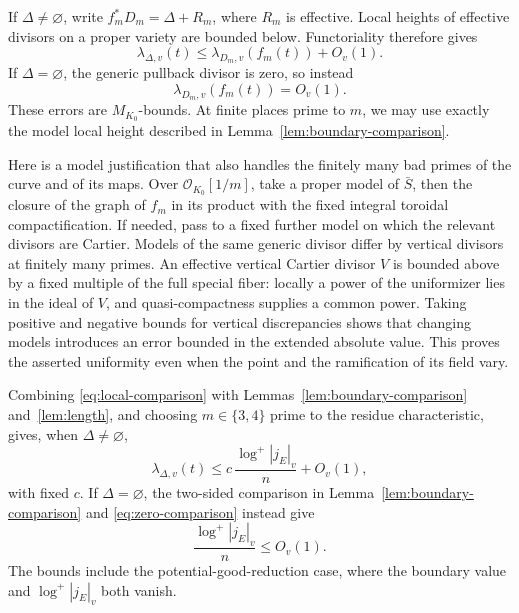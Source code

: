 \documentclass[11pt,a4paper]{article}
\numberwithin{equation}{section}
\theoremstyle{definition}
\theoremstyle{remark}
\begin{document}
If \(\Delta\ne\varnothing\), write
\(f_m^*D_m=\Delta+R_m\), where \(R_m\) is effective. Local heights of
effective divisors on a proper variety are bounded below.
Functoriality therefore gives
\begin{equation}\label{eq:local-comparison}
 \lambda_{\Delta,v}(t)
 \le\lambda_{D_m,v}(f_m(t))+O_v(1).
\end{equation}
If \(\Delta=\varnothing\), the generic pullback divisor is zero, so
instead
\begin{equation}\label{eq:zero-comparison}
 \lambda_{D_m,v}(f_m(t))=O_v(1).
\end{equation}
These errors are \(M_{K_0}\)-bounds. At finite places prime to \(m\),
we may use exactly the model local height described in
Lemma~\ref{lem:boundary-comparison}.

Here is a model justification that also handles the finitely many
bad primes of the curve and of its maps. Over
\(\mathcal O_{K_0}[1/m]\), take a proper model of \(\bar S\),
then the closure of the graph of \(f_m\) in its product with the
fixed integral toroidal compactification. If needed, pass to a
fixed further model on which the relevant divisors are Cartier. Models of the same generic divisor differ by
vertical divisors at finitely many primes. An effective vertical
Cartier divisor \(V\) is bounded above by a fixed multiple of the
full special fiber: locally a power of the uniformizer lies in the
ideal of \(V\), and quasi-compactness supplies a common power.
Taking positive and negative bounds for vertical discrepancies
shows that changing models introduces an error bounded in the
extended absolute value. This proves the asserted uniformity even
when the point and the ramification of its field vary.

Combining \eqref{eq:local-comparison} with
Lemmas~\ref{lem:boundary-comparison} and~\ref{lem:length},
and choosing \(m\in\{3,4\}\) prime to the residue characteristic,
gives, when \(\Delta\ne\varnothing\),
\begin{equation}\label{eq:finite-bound}
 \lambda_{\Delta,v}(t)
 \le c\,\frac{\log^+|j_E|_v}{n}+O_v(1),
\end{equation}
with fixed \(c\). If \(\Delta=\varnothing\), the two-sided comparison in
Lemma~\ref{lem:boundary-comparison} and \eqref{eq:zero-comparison} instead give
\begin{equation}\label{eq:finite-empty}
 \frac{\log^+|j_E|_v}{n}\le O_v(1).
\end{equation}
The bounds include the potential-good-reduction case, where the
boundary value and \(\log^+|j_E|_v\) both vanish.
\end{document}
